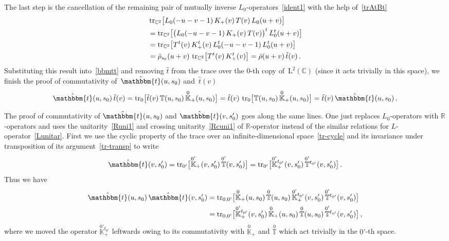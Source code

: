 \documentclass[a4paper,11pt]{article}
\newcommand{\tr}{\mathop{\rm tr}\nolimits}
\numberwithin{equation}{section}
\begin{document}
The last step is the cancellation of the remaining pair of mutually inverse $L_0$-operators~\eqref{ident1} with the help of~\eqref{trAtBt}
\begin{align*}
	&
	\tr_{\mathbb{C}^2}\bigl[L_0(-u-v-1)\,K_+(v)\,T(v)\,L_0(u+v)\bigr] \\
	& =
	\tr_{\mathbb{C}^2}\bigl[\bigl(L_0(-u-v-1)\,K_+(v)\,T(v)\bigr)^t \, L_0^t(u+v)\bigr] \\
	& =
	\tr_{\mathbb{C}^2}\bigl[T^t(v)\,K_+^t(v)\,L_0^t(-u-v-1)\, L_0^t(u+v)\bigr] \\
	& =
	\tilde{\rho}_{s_0}(u+v)\,\tr_{\mathbb{C}^2}\bigl[T^t(v)\,K_+^t(v)\bigr]
	= \tilde{\rho}(u+v)\,\hat{t}(v) \,.
\end{align*}
Substituting this result into~\eqref{bbmtt} and removing $\hat{t}$ from the trace over the $0$-th copy of~$\mathrm{L}^2(\mathbb{C})$ (since it acts trivially in this space), we finish the proof of commutativity of~$\hat{\mathbbm{t}}(u,s_0)$ and~$\hat{t}(v)$
\begin{align} \nonumber
	\hat{\mathbbm{t}}(u,s_0)\,\hat{t}(v) =
	\tr_0\bigl[\hat{t}(v)\,\mathbb{T}(u,s_0)\,\overset{0}{\mathbb{K}}_+(u,s_0)\bigr]
	=
	\hat{t}(v) \, \tr_0\bigl[\mathbb{T}(u,s_0)\,\overset{0}{\mathbb{K}}_+(u,s_0)\bigr] =
	\hat{t}(v) \, \hat{\mathbbm{t}}(u,s_0) \,.
\end{align}


The proof of commutativity of $\hat{\mathbbm{t}}(u,s_0)$ and $\hat{\mathbbm{t}}(v,s_0')$ goes along the same lines.
One just replaces $L_0$-operators with $\mathbb{R}$-operators and uses the unitarity~\eqref{Runi1} and crossing unitarity~\eqref{Rcuni1} of $\mathbb{R}$-operator instead of the similar relations for $L$-operator~\eqref{Lunitar}.
First we use the cyclic property of the trace over an infinite-dimensional space~\eqref{tr-cycle} and its invariance under transposition of its argument~\eqref{tr-transp} to write
\begin{equation}
	\hat{\mathbbm{t}}(v,s_0') =
	\tr_{0'}\bigl[\overset{0'}{\mathbb{K}}_+(v,s_0')\,\overset{0'}{\mathbb{T}}(v,s_0')\bigr] =
	\tr_{0'}\bigl[\overset{0'}{\mathbb{K}}{}_+^{t_{0'}}(v,s_0')\,\overset{0'}{\mathbb{T}}{}^{t_{0'}}(v,s_0')\bigr] \,.
\end{equation}
Thus we have
\begin{align*}
	\hat{\mathbbm{t}}(u,s_0)\,\hat{\mathbbm{t}}(v,s_0') & =
	\tr_{0,0'}\bigl[\overset{0}{\mathbb{K}}_+(u,s_0)\,\overset{0}{\mathbb{T}}(u,s_0)\,\overset{0'}{\mathbb{K}}{}_+^{t_{0'}}(v,s_0')\,\overset{0'}{\mathbb{T}}{}^{t_{0'}}(v,s_0')\bigr] \\
	& =
	\tr_{0,0'}\bigl[\overset{0'}{\mathbb{K}}{}_+^{t_{0'}}(v,s_0')\,\overset{0}{\mathbb{K}}_+(u,s_0)\,\overset{0}{\mathbb{T}}(u,s_0)\,\overset{0'}{\mathbb{T}}{}^{t_{0'}}(v,s_0')\bigr] \,,
\end{align*}
where we moved the operator $\overset{0'}{\mathbb{K}}{}_+^{t_{0'}}$ leftwards owing to its commutativity with $\overset{0}{\mathbb{K}}_+$ and $\overset{0}{\mathbb{T}}$ which act trivially in the $0'$-th space.
\end{document}
